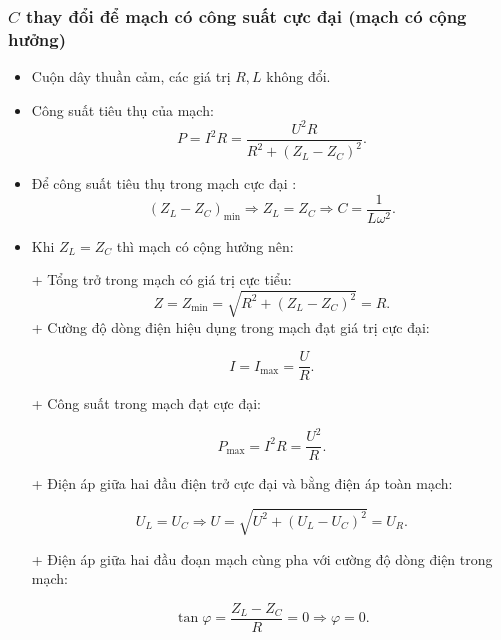 \subsubsection {$C$ thay đổi để mạch có công suất cực đại (mạch có cộng hưởng)}
\begin{itemize}
	\item Cuộn dây thuần cảm, các giá trị $R, L$ không đổi.
	\item  Công suất tiêu thụ của mạch:
	\begin{equation*}
		P=I^2R=\dfrac{U^2R}{R^2+(Z_L-Z_C)^2}.
	\end{equation*}
	\item Để công suất tiêu thụ trong mạch cực đại :
	\begin{equation*}
		(Z_L-Z_C)_{\text{min}} \Rightarrow Z_L =Z_C \Rightarrow C =\dfrac{1}{L \omega^2}.
	\end{equation*}
	\item Khi $Z_L = Z_C$ thì mạch có cộng hưởng nên:
	
	+ Tổng trở trong mạch có giá trị cực tiểu:
	\begin{equation*}
		Z=Z_{\text{min}}=\sqrt {R^2 + (Z_L-Z_C)^2} =R.
	\end{equation*}
	+ Cường độ dòng điện hiệu dụng trong mạch đạt giá trị cực đại:
	
	\begin{equation*}
		I=I_{\text{max}} =\dfrac{U}{R}.
	\end{equation*}
	
	+ Công suất trong mạch đạt cực đại:
	
	\begin{equation*}
		P_{\text{max}} = I^2R =\dfrac{U^2}{R}.
	\end{equation*}
	
	+ Điện áp giữa hai đầu điện trở cực đại và bằng điện áp toàn mạch:
	
	\begin{equation*}
		U_L=U_C \Rightarrow U =\sqrt {U^2 + (U_L-U_C)^2}= U_R.
	\end{equation*}
	
	+ Điện áp giữa hai đầu đoạn mạch cùng pha với cường độ dòng điện trong mạch:
	
	\begin{equation*}
		\tan \varphi = \dfrac{Z_L-Z_C}{R}=0 \Rightarrow \varphi =0.
	\end{equation*}
\end{itemize} 

